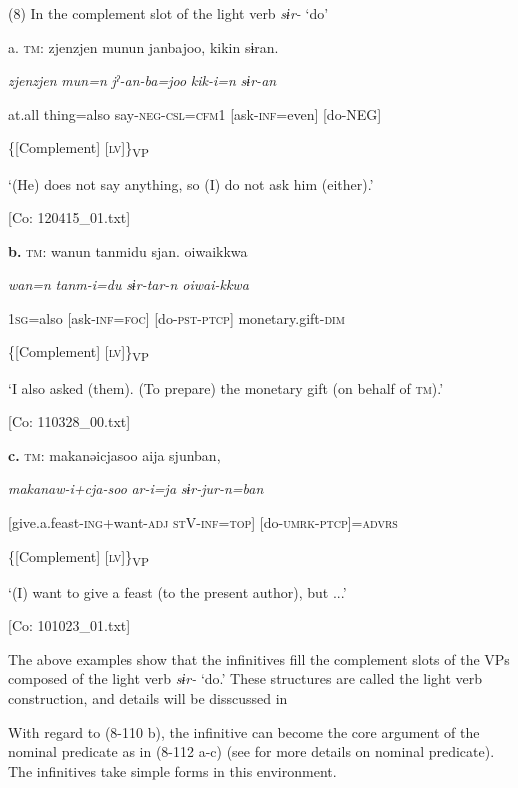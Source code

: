 (8)  In the complement slot of the light verb \textit{sɨr-} ‘do’

  a.  \textsc{tm}:  zjenzjen  munun  janbajoo,  kikin  sɨran.

      \textit{zjenzjen}  \textit{mun=n}  \textit{jˀ-an-ba=joo}  \textit{kik-i=n}  \textit{sɨr{}-an}

      at.all  thing=also  say-\textsc{neg}-\textsc{csl}=\textsc{cfm}1  [ask-\textsc{inf}=even]  [do-NEG]

            \{[Complement]  [\textsc{lv}]\}\textsubscript{VP}

      ‘(He) does not say anything, so (I) do not ask him (either).’

      [Co: 120415\_01.txt]

  \textbf{b.}  \textsc{tm}:  wanun  tanmidu  sjan.  {\textbar}oiwai{\textbar}kkwa

      \textit{wan=n}  \textit{tanm-i=du}  \textit{sɨr{}-tar-n  oiwai-kkwa}

      1\textsc{sg}=also  [ask-\textsc{inf}=\textsc{foc}]  [do-\textsc{pst}-\textsc{ptcp}]  monetary.gift-\textsc{dim}

        \{[Complement]  [\textsc{lv}]\}\textsubscript{VP}

      ‘I also asked (them). (To prepare) the monetary gift (on behalf of \textsc{tm}).’

      [Co: 110328\_00.txt]

  \textbf{c.}  \textsc{tm}:  makanəicjasoo  aija  sjunban,

      \textit{makanaw-i+cja-soo}  \textit{ar-i=ja}  \textit{sɨr{}-jur-n=ban}

      [give.a.feast-\textsc{ing}+want-\textsc{adj}  \textsc{st}V-\textsc{inf}=\textsc{top}]  [do-\textsc{umrk}-\textsc{ptcp}]=\textsc{advrs}

      \{[Complement]    [\textsc{lv}]\}\textsubscript{VP}

      ‘(I) want to give a feast (to the present author), but ...’

      [Co: 101023\_01.txt]

The above examples show that the infinitives fill the complement slots of the VPs composed of the light verb \textit{sɨr-} ‘do.’ These structures are called the light verb construction, and details will be disscussed in 

  With regard to (8-110 b), the infinitive can become the core argument of the nominal predicate as in (8-112 a-c) (see  for more details on nominal predicate). The infinitives take simple forms in this environment.

